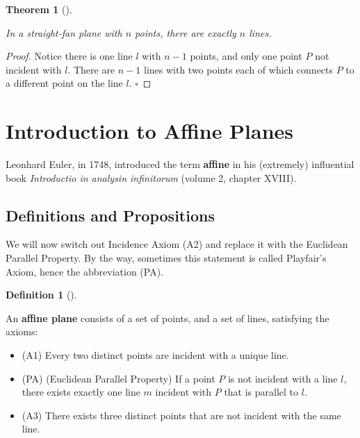 \documentclass[
  twoside,
  12pt,
  letterpaper,
  fleqn]{article}
\providecommand{\tightlist}{%
  \setlength{\itemsep}{0pt}\setlength{\parskip}{0pt}}\usepackage{longtable,booktabs,array}
\theoremstyle{definition}
\newtheorem{definition}{Definition}[section]
\theoremstyle{definition}
\theoremstyle{plain}
\theoremstyle{plain}
\newtheorem{theorem}{Theorem}[section]
\theoremstyle{remark}
\begin{document}
\begin{theorem}[]\protect\hypertarget{thm-straight-fan-points-lines}{}\label{thm-straight-fan-points-lines}

In a straight-fan plane with \(n\) points, there are exactly \(n\)
lines.

\end{theorem}

\begin{proof}

Notice there is one line \(l\) with \(n-1\) points, and only one point
\(P\) not incident with \(l.\) There are \(n-1\) lines with two points
each of which connects \(P\) to a different point on the line \(l.\)
\(\square\)

\end{proof}

\hypertarget{introduction-to-affine-planes}{%
\section{Introduction to Affine
Planes}\label{introduction-to-affine-planes}}

Leonhard Euler, in 1748, introduced the term \textbf{affine} in his
(extremely) influential book \emph{Introductio in analysin infinitorum}
(volume 2, chapter XVIII).

\hypertarget{definitions-and-propositions}{%
\subsection{Definitions and
Propositions}\label{definitions-and-propositions}}

We will now switch out Incidence Axiom (A2) and replace it with the
Euclidean Parallel Property. By the way, sometimes this statement is
called Playfair's Axiom, hence the abbreviation (PA).

\begin{definition}[]\protect\hypertarget{def-affine-plane}{}\label{def-affine-plane}

An \textbf{affine plane} consists of a set of points, and a set of
lines, satisfying the axioms:

\end{definition}

\begin{itemize}
\tightlist
\item
  (A1) Every two distinct points are incident with a unique line.
\item
  (PA) (Euclidean Parallel Property) If a point \(P\) is not incident
  with a line \(l,\) there exists exactly one line \(m\) incident with
  \(P\) that is parallel to \(l.\)
\item
  (A3) There exists three distinct points that are not incident with the
  same line.
\end{itemize}
\end{document}
